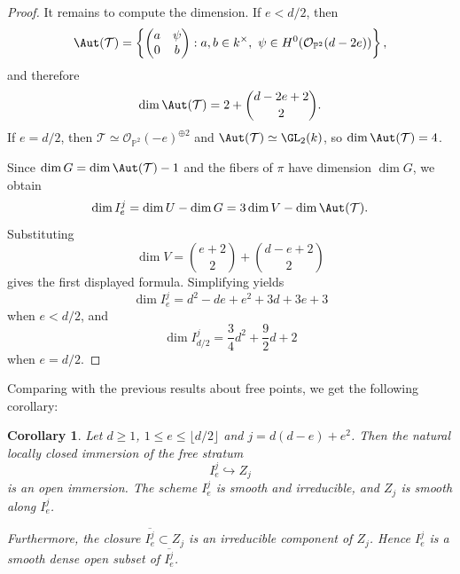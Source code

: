 \documentclass[11pt]{amsart} %
\newtheorem{Corollary}[Theorem]{Corollary}
\theoremstyle{definition}
\def\NZQ{\mathbb}               %
\def\PP{{\NZQ P}}
\def\T{{\mathcal T}}
\begin{document}
\begin{proof}
It remains to compute the dimension. If $e<d/2$, then
\[
\Aut(\T)
=
\left\{
\begin{pmatrix}
a&\psi\\
0&b
\end{pmatrix}
:
a,b\in k^\times,\ 
\psi\in H^0(\mathcal O_{\PP^2}(d-2e))
\right\},
\]
and therefore
\[
\dim\Aut(\T)
=
2+\binom{d-2e+2}{2}.
\]
If $e=d/2$, then
\(
\T\simeq\mathcal O_{\PP^2}(-e)^{\oplus2}\) and \(\Aut(\T)\simeq\GL_2(k)\),
so \(\dim\Aut(\T)=4\).

Since \(\dim G=\dim\Aut(\T)-1\)
and the fibers of $\pi$ have dimension $\dim G$, we obtain
\[
\dim I_e^j
=
\dim U-\dim G
=
3\dim V-\dim\Aut(\T).
\]
Substituting
\[
\dim V
=
\binom{e+2}{2}+\binom{d-e+2}{2}
\]
gives the first displayed formula. Simplifying yields
\[
\dim I_e^j
=
d^2-de+e^2+3d+3e+3
\]
when $e<d/2$, and
\[
\dim I_{d/2}^j
=
\frac34d^2+\frac92d+2
\]
when $e=d/2$.
\end{proof}

Comparing with the previous results about free points, we get the following corollary:

\begin{Corollary}\label{cor:free-points-picture}
Let $d \geq 1$, $1 \leq e \leq \lfloor d/2 \rfloor$ and $j = d(d-e)+e^2$. Then the natural locally closed immersion of the free stratum 
$$
I_e^j \hookrightarrow Z_j
$$
is an open immersion. The scheme $I_e^j$ is smooth and irreducible, and $Z_j$ is smooth along $I_e^j$.

Furthermore, the closure $\overline{I_e^j} \subset Z_j$ is an irreducible component of $Z_j$. Hence $I_e^j$ is a smooth dense open subset of $\overline{I_e^j}$.
\end{Corollary}
\end{document}
